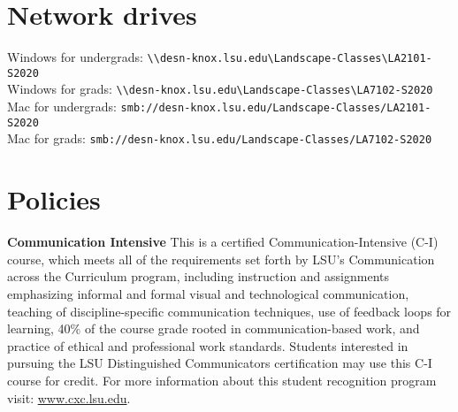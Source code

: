 \documentclass[11pt,article,oneside]{memoir}
\begin{document}
\section{Network drives}


\noindent
Windows for undergrads: \verb|\\desn-knox.lsu.edu\Landscape-Classes\LA2101-S2020| \\
Windows for grads: \verb|\\desn-knox.lsu.edu\Landscape-Classes\LA7102-S2020| \\

\noindent
Mac for undergrads: \verb|smb://desn-knox.lsu.edu/Landscape-Classes/LA2101-S2020| \\
Mac for grads: \verb|smb://desn-knox.lsu.edu/Landscape-Classes/LA7102-S2020| \\

%

\section{Policies}


\noindent \textbf{Communication Intensive}
This is a certified Communication-Intensive (C-I) course,
which meets all of the requirements set
forth by LSU’s Communication across the Curriculum program, including
 instruction and assignments emphasizing
informal and formal visual and technological communication,
teaching of discipline-specific communication techniques,
use of feedback loops for learning,
40\% of the course grade rooted in communication-based work, and
practice of ethical and professional work standards.
Students interested in pursuing the LSU Distinguished Communicators 
certification may use this C-I course for credit. 
For more information about this student recognition program visit: 
\url{www.cxc.lsu.edu}.\\
\end{document}
